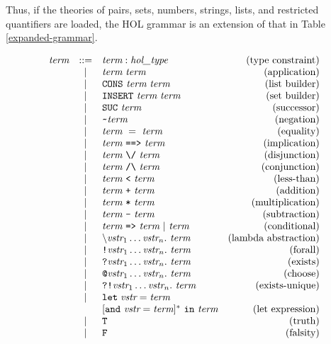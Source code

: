 \documentclass[12pt,fleqn,a4paper]{report}
\makeatletter
\newcommand{\vstr}       {\mbox{\it vstr}}
\newcommand{\type}       {\mbox{\it hol\_type}}
\newcommand{\term}       {\mbox{\it term}}
\newcommand{\bs}         {\mbox{$\backslash$}}
\newcommand{\SUC}       {\mbox{\tt SUC}}
\newcommand{\CONS}       {\mbox{\tt CONS}}
\newcommand{\INSERT}    {\mbox{\tt INSERT}}
\newcommand{\IMP}       {\mbox{\tt ==>}}
\newcommand{\LET}       {\mbox{\tt let}}
\newcommand{\IN}       {\mbox{\tt in}}
\newcommand{\und}       {\mbox{\tt and}}
\newcommand{\ALL}       {\mbox{\tt !}}
\newcommand{\EXISTS}       {\mbox{\tt ?}}
\newcommand{\EXISTSONE}       {\mbox{\tt ?!}}
\newcommand{\CHOOSE}       {\mbox{\tt @}}
\makeatother
\begin{document}
Thus, if the theories of pairs, sets, numbers, strings, lists, and
restricted quantifiers are loaded, the HOL grammar is an extension of
that in Table \ref{expanded-grammar}.
\begin{table}
  \[
  \begin{array}{rclr}
    \term & ::= & \term : \type & \mbox{(type constraint)} \\
    & | & \term\ \term & \mbox{(application)} \\
    & | & \CONS\ \term \ \term & \mbox{(list builder)} \\
    & | & \INSERT\ \term \ \term & \mbox{(set builder)} \\
    & | & \SUC\ \term & \mbox{(successor)} \\
    & | & \verb+~+ \term & \mbox{(negation)} \\
    & | & \term\ =\ \term & \mbox{(equality)} \\
    & | & \term\ \IMP\ \term & \mbox{(implication)} \\
    & | & \term\ \verb+\/+\ \term & \mbox{(disjunction)} \\
    & | & \term\ \verb+/\+\ \term & \mbox{(conjunction)} \\
    & | & \term\ \verb+<+ \ \term & \mbox{(less-than)} \\
    & | & \term\ \verb!+! \ \term & \mbox{(addition)} \\
    & | & \term\ \verb!*! \ \term & \mbox{(multiplication)} \\
    & | & \term\ \verb!-! \ \term & \mbox{(subtraction)} \\
    & | & \term\ \verb+=>+\ \term\ |\ \term & \mbox{(conditional)} \\
    & | & \bs\vstr_1\ldots\vstr_n.\ \term & \mbox{(lambda abstraction)} \\
    & | & \ALL \vstr_1\ldots\vstr_n.\ \term & \mbox{(forall)} \\
    & | & \EXISTS \vstr_1\ldots\vstr_n.\ \term & \mbox{(exists)} \\
    & | & \CHOOSE \vstr_1\ldots\vstr_n.\ \term & \mbox{(choose)} \\
    & | & \EXISTSONE \vstr_1\ldots\vstr_n.\ \term &\mbox{(exists-unique)} \\
    & | & \LET\; \vstr = \term  & \\
    &   & [\und\ \vstr = \term]^{*}\ \IN\ \term & \mbox{(let expression)} \\
    & | & \verb+T+ & \mbox{(truth)} \\
    & | & \verb+F+ & \mbox{(falsity)} \\

\end{array}\]
\end{table}
\end{document}

